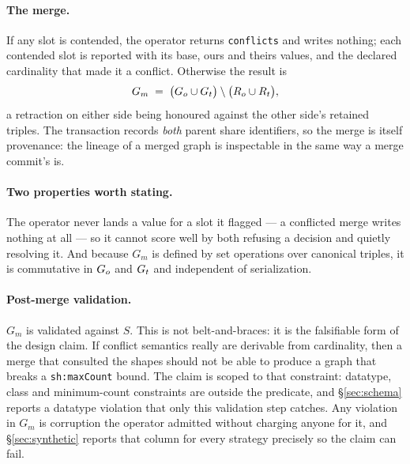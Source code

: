 \paragraph{The merge.} If any slot is contended, the operator returns
\texttt{conflicts} and writes nothing; each contended slot is reported with its
base, ours and theirs values, and the declared cardinality that made it a
conflict. Otherwise the result is
\[
  G_m \;=\; \bigl( G_{o} \cup G_{t} \bigr) \setminus \bigl( R_o \cup R_t \bigr),
\]
a retraction on either side being honoured against the other side's retained
triples. The transaction records \emph{both} parent share identifiers, so the
merge is itself provenance: the lineage of a merged graph is inspectable in the
same way a merge commit's is.

\paragraph{Two properties worth stating.} The operator never lands a value for a
slot it flagged --- a conflicted merge writes nothing at all --- so it cannot
score well by both refusing a decision and quietly resolving it. And because
$G_m$ is defined by set operations over canonical triples, it is commutative in
$G_{o}$ and $G_{t}$ and independent of serialization.

\paragraph{Post-merge validation.} $G_m$ is validated against $S$. This is not
belt-and-braces: it is the falsifiable form of the design claim. If conflict
semantics really are derivable from cardinality, then a merge that consulted the
shapes should not be able to produce a graph that breaks a \texttt{sh:maxCount}
bound. The claim is scoped to that constraint: datatype, class and minimum-count
constraints are outside the predicate, and \S\ref{sec:schema} reports a datatype
violation that only this validation step catches. Any
violation in $G_m$ is corruption the operator admitted without charging anyone
for it, and \S\ref{sec:synthetic} reports that column for every strategy
precisely so the claim can fail.
